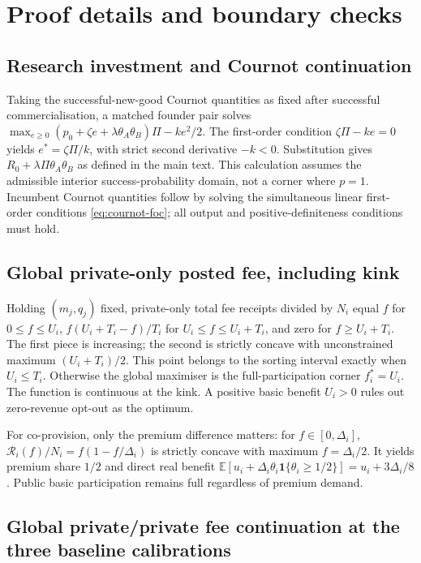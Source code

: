 \section{Proof details and boundary checks}\label{app:proofs}

\subsection{Research investment and Cournot continuation}
Taking the successful-new-good Cournot quantities as fixed after successful commercialisation, a matched founder pair solves
$\max_{e\geq0}(p_0+\zeta e+\lambda\theta_A\theta_B)\Pi-ke^2/2$.
The first-order condition $\zeta\Pi-ke=0$ yields $e^*=\zeta\Pi/k$, with strict second derivative $-k<0$. Substitution gives $R_0+\lambda\Pi\theta_A\theta_B$ as defined in the main text. This calculation assumes the admissible interior success-probability domain, not a corner where $p=1$. Incumbent Cournot quantities follow by solving the simultaneous linear first-order conditions \eqref{eq:cournot-foc}; all output and positive-definiteness conditions must hold.

\subsection{Global private-only posted fee, including kink}
Holding $(m_j,q_j)$ fixed, private-only total fee receipts divided by $N_i$ equal $f$ for $0\leq f\leq U_i$, $f(U_i+T_i-f)/T_i$ for $U_i\leq f\leq U_i+T_i$, and zero for $f\geq U_i+T_i$. The first piece is increasing; the second is strictly concave with unconstrained maximum $(U_i+T_i)/2$. This point belongs to the sorting interval exactly when $U_i\leq T_i$. Otherwise the global maximiser is the full-participation corner $f_i^*=U_i$. The function is continuous at the kink. A positive basic benefit $U_i>0$ rules out zero-revenue opt-out as the optimum.

For co-provision, only the premium difference matters: for $f\in[0,\Delta_i]$,
$\mathcal R_i(f)/N_i=f(1-f/\Delta_i)$ is strictly concave with maximum $f=\Delta_i/2$. It yields premium share $1/2$ and direct real benefit $\mathbb E[u_i+\Delta_i\theta_i\mathbf1\{\theta_i\geq1/2\}]=u_i+3\Delta_i/8$. Public basic participation remains full regardless of premium demand.

\subsection{Global private/private fee continuation at the three baseline calibrations}\label{app:pp-global}

